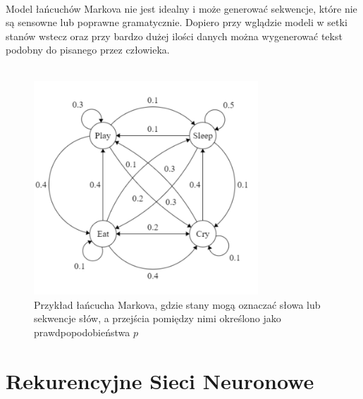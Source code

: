 \documentclass{article}
\begin{document}
\\
Model łańcuchów Markova nie jest idealny i może generować sekwencje, które nie są sensowne lub poprawne gramatycznie. Dopiero przy wglądzie modeli w setki stanów wstecz oraz przy bardzo dużej ilości danych można wygenerować tekst podobny do pisanego przez człowieka. \\
\\
\begin{figure}[h]
    \centering
    \includegraphics[width=0.75\textwidth]{plot}
    \caption{Przykład łańcucha Markova, gdzie stany mogą oznaczać słowa lub sekwencje słów, a przejścia pomiędzy nimi określono jako prawdpopodobieństwa $p$}
    \label{fig:mesh1}
\end{figure}

\newpage
\section{Rekurencyjne Sieci Neuronowe}
\end{document}
